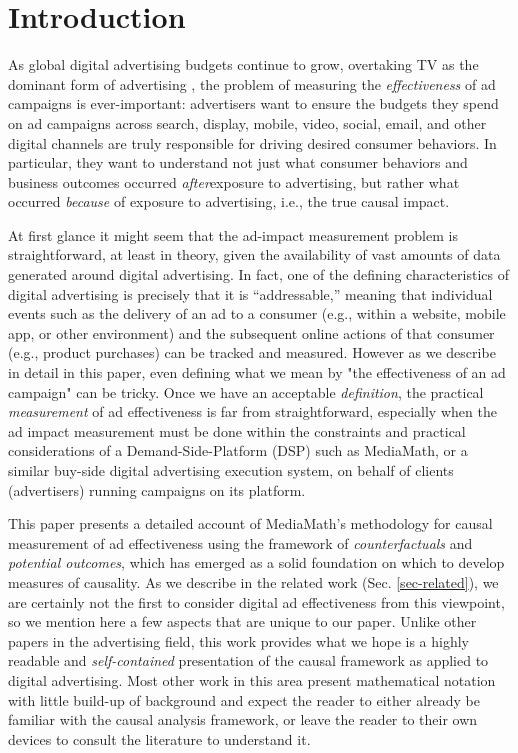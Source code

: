 \documentclass[11pt,a4paper]{article}
\theoremstyle{definition}
\theoremstyle{remark}
\theoremstyle{definition}
\theoremstyle{definition}
\theoremstyle{definition}
\theoremstyle{definition}
\theoremstyle{definition}
\theoremstyle{definition}
\begin{document}
\section{Introduction}

As global digital advertising budgets continue to grow, overtaking TV as the dominant form of advertising \cite{emarketer-2016},
the problem of measuring the \textit{effectiveness} of ad campaigns is ever-important: 
advertisers want to ensure the budgets they spend on ad campaigns across search, display, mobile, video, social, email, and other digital channels are truly responsible for driving desired consumer behaviors. In particular, they want to understand not just what consumer behaviors and business outcomes occurred \textit{after}exposure to advertising, but rather what occurred \textit{because} of exposure to advertising, i.e., the true causal impact.

At first glance it might seem that the ad-impact measurement problem is  straightforward, at least in theory,  
given the availability of vast amounts of data generated around digital advertising. In fact, one of the defining characteristics of digital advertising is precisely that it is “addressable,” meaning that individual events such as the delivery of an ad to a consumer (e.g., within a website, mobile app, or other environment) and the subsequent online actions of that consumer (e.g., product purchases) can be tracked and measured. However as we describe in detail in this paper, even defining what we mean by "the effectiveness of an ad campaign" can be tricky. Once we have an acceptable \textit{definition}, the practical \textit{measurement} of ad effectiveness is far from straightforward, especially when the ad impact measurement must be done within the constraints and practical considerations of a Demand-Side-Platform (DSP) such as MediaMath, or a similar buy-side digital advertising execution system, on behalf of clients (advertisers) running campaigns on its platform.

This paper presents a detailed account of MediaMath's methodology for causal measurement of ad effectiveness 
using the  framework of \textit{counterfactuals} and \textit{potential outcomes}, which has emerged as a solid foundation on which to develop measures of causality. As we describe in the related work (Sec. \ref{sec-related}), we are certainly not the first to consider digital ad effectiveness from this viewpoint, so we mention here a few aspects that are unique to our paper. Unlike other papers in the advertising field, this work provides what we hope is a highly readable and \textit{self-contained} presentation of the causal framework as applied to digital advertising. Most other work in this area present mathematical notation with little build-up of background and expect the reader to either already be familiar with the causal analysis framework, or leave the reader to their own devices to consult the literature to understand it. 
\end{document}
